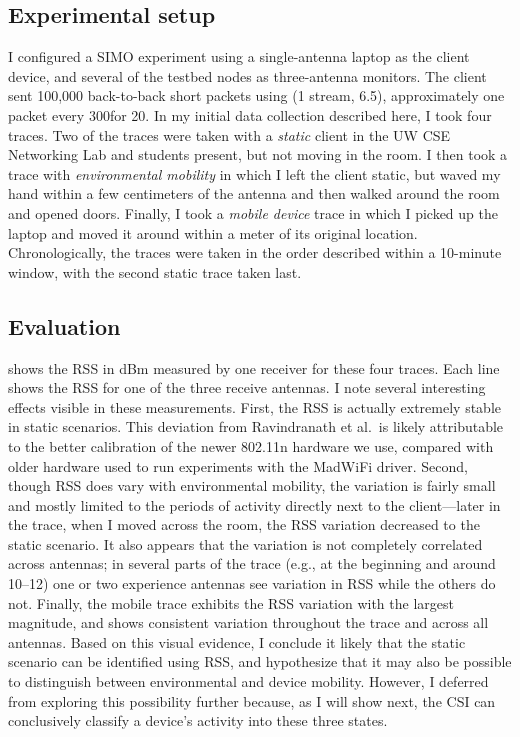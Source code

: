\subsection{Experimental setup}
I configured a SIMO experiment using a single-antenna laptop as the client device, and several of the testbed nodes as three-antenna monitors. The client sent 100,000 back-to-back short packets using  (1 stream, 6.5\Mbps), approximately one packet every 300\us for 20\s. In my initial data collection described here, I took four traces. Two of the traces were taken with a \emph{static} client in the UW CSE Networking Lab and students present, but not moving in the room. I then took a trace with \emph{environmental mobility} in which I left the client static, but waved my hand within a few centimeters of the antenna and then walked around the room and opened doors. Finally, I took a \emph{mobile device} trace in which I picked up the laptop and moved it around within a meter of its original location. Chronologically, the traces were taken in the order described within a 10-minute window, with the second static trace taken last. 

\subsection{Evaluation}
  shows the RSS in dBm measured by one receiver for these four traces. Each line shows the RSS for one of the three receive antennas. I note several interesting effects visible in these measurements. First, the RSS is actually extremely stable in static scenarios. This deviation from Ravindranath et al.\ is likely attributable to the better calibration of the newer 802.11n hardware we use, compared with older hardware used to run experiments with the MadWiFi driver. Second, though RSS does vary with environmental mobility, the variation is fairly small and mostly limited to the periods of activity directly next to the client---later in the trace, when I moved across the room, the RSS variation decreased to the static scenario. It also appears that the variation is not completely correlated across antennas; in several parts of the trace (e.g., at the beginning and around 10--12\s) one or two experience antennas see variation in RSS while the others do not. Finally, the mobile trace exhibits the RSS variation with the largest magnitude, and shows consistent variation throughout the trace and across all antennas. Based on this visual evidence, I conclude it likely that the static scenario can be identified using RSS, and hypothesize that it may also be possible to distinguish between environmental and device mobility. However, I deferred from exploring this possibility further because, as I will show next, the CSI can conclusively classify a device's activity into these three states.

